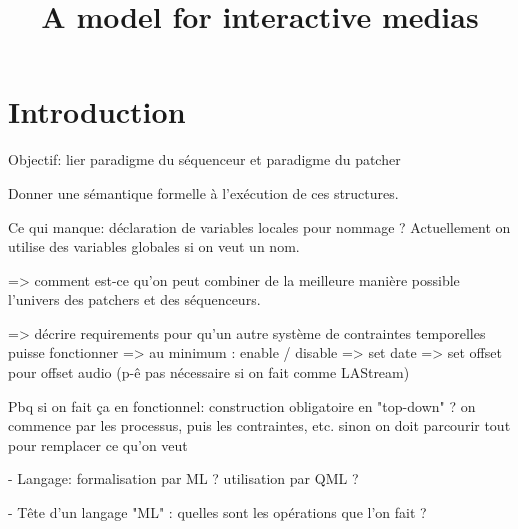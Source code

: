 \documentclass[a4paper]{article}
\title{A model for interactive medias}
\begin{document}
\section{Introduction}
Objectif: lier paradigme du séquenceur et paradigme du patcher

Donner une sémantique formelle à l'exécution de ces structures.

Ce qui manque: déclaration de variables locales pour nommage ? Actuellement on utilise des variables globales si on veut un nom.

=> comment est-ce qu'on peut combiner de la meilleure manière possible l'univers des patchers et des séquenceurs.

=> décrire requirements pour qu'un autre système de contraintes temporelles puisse fonctionner 
=> au minimum : enable / disable
=> set date
=> set offset pour offset audio (p-ê pas nécessaire si on fait comme LAStream)

Pbq si on fait ça en fonctionnel: construction obligatoire en "top-down" ? on commence par les processus, puis les contraintes, etc. 
sinon on doit parcourir tout pour remplacer ce qu'on veut

- Langage: formalisation par ML ? utilisation par QML ?

- Tête d'un langage "ML" : quelles sont les opérations que l'on fait ? 

\end{document}

